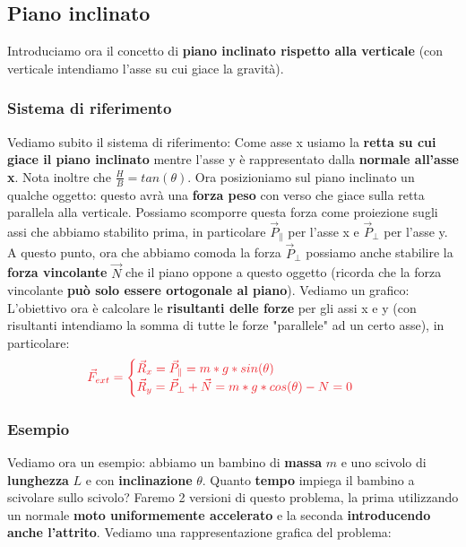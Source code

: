    \subsection{Piano inclinato}
        Introduciamo ora il concetto di \textbf{piano inclinato rispetto alla verticale} (con verticale intendiamo l'asse su cui giace la gravità).

        \subsubsection{Sistema di riferimento}
            Vediamo subito il sistema di riferimento:
            Come asse x usiamo la \textbf{retta su cui giace il piano inclinato} mentre l'asse y è rappresentato dalla \textbf{normale all'asse x}. Nota inoltre che $\frac{H}{B} = tan(\theta)$.
            Ora posizioniamo sul piano inclinato un qualche oggetto: questo avrà una \textbf{forza peso} con verso che giace sulla retta parallela alla verticale. Possiamo scomporre questa forza come proiezione sugli assi che abbiamo stabilito prima, in particolare $\vec{P}_\parallel$ per l'asse x e $\vec{P}_\bot$ per l'asse y. A questo punto, ora che abbiamo comoda la forza $\vec{P}_\bot$ possiamo anche stabilire la \textbf{forza vincolante} $\vec{N}$ che il piano oppone a questo oggetto (ricorda che la forza vincolante \textbf{può solo essere ortogonale al piano}). Vediamo un grafico:
            L'obiettivo ora è calcolare le \textbf{risultanti delle forze} per gli assi x e y (con risultanti intendiamo la somma di tutte le forze "parallele" ad un certo asse), in particolare:
            \label{Risultanti_piano_inclinato}
            \begin{align*}
                &\textcolor{Red}{\vec{F}_{ext} =
                \begin{cases}
                    \vec{R}_x = \vec{P}_\parallel = m*g*sin(\theta)\\
                    \vec{R}_y = \vec{P}_\bot + \vec{N} = m*g*cos(\theta) - N = 0\\
                \end{cases}}
            \end{align*}

        \subsubsection{Esempio}
            Vediamo ora un esempio: abbiamo un bambino di \textbf{massa} $m$ e uno scivolo di \textbf{lunghezza} $L$ e con \textbf{inclinazione} $\theta$. Quanto \textbf{tempo} impiega il bambino a scivolare sullo scivolo? Faremo 2 versioni di questo problema, la prima utilizzando un normale \textbf{moto uniformemente accelerato} e la seconda \textbf{introducendo anche l'attrito}. Vediamo una rappresentazione grafica del problema:

